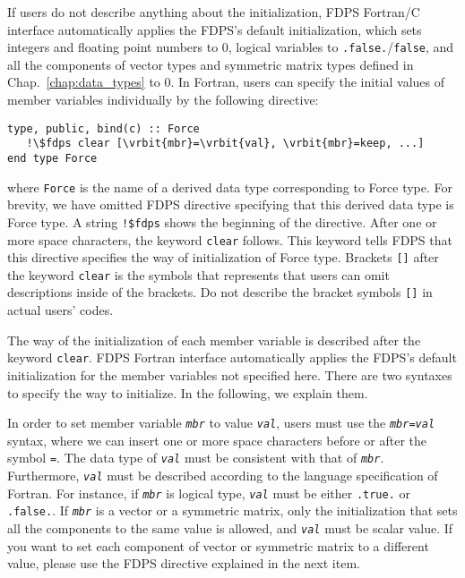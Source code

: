 \begin{enumerate}[leftmargin=*,label=(\arabic*)]
 If users do not describe anything about the initialization, FDPS Fortran/C interface automatically applies the FDPS's default initialization, which sets integers and floating point numbers to 0, logical variables to \texttt{.false.}/\texttt{false}, and all the components of vector types and symmetric matrix types defined in Chap.~\ref{chap:data_types} to 0.
In Fortran, users can specify the initial values of member variables individually by the following directive:
\begin{screen}
\begin{Verbatim}[commandchars=\\\{\}]
type, public, bind(c) :: Force
   !\$fdps clear [\vrbit{mbr}=\vrbit{val}, \vrbit{mbr}=keep, ...] 
end type Force
\end{Verbatim}
\end{screen}
where \texttt{Force} is the name of a derived data type corresponding to Force type. For brevity, we have omitted FDPS directive specifying that this derived data type is Force type. A string \texttt{!\$fdps} shows the beginning of the directive. After one or more space characters, the keyword \texttt{clear} follows. This keyword tells FDPS that this directive specifies the way of initialization of Force type. Brackets \texttt{[]} after the keyword \texttt{clear} is the symbols that represents that users can omit descriptions inside of the brackets. Do not describe the bracket symbols \texttt{[]} in actual users' codes.

The way of the initialization of each member variable is described after the keyword \texttt{clear}. FDPS Fortran interface automatically applies the FDPS's default initialization for the member variables not specified here. There are two syntaxes to specify the way to initialize. In the following, we explain them.

In order to set member variable \textit{\texttt{mbr}} to value \textit{\texttt{val}}, users must use the \texttt{\textit{mbr}=\textit{val}} syntax, where we can insert one or more space characters before or after the symbol \texttt{=}. The data type of \textit{\texttt{val}} must be consistent with that of \textit{\texttt{mbr}}. Furthermore, \textit{\texttt{val}} must be described according to the language specification of Fortran. For instance, if \textit{\texttt{mbr}} is logical type, \textit{\texttt{val}} must be either \texttt{.true.} or \texttt{.false.}. If \textit{\texttt{mbr}} is a vector or a symmetric matrix, only the initialization that sets all the components to the same value is allowed, and \textit{\texttt{val}} must be scalar value. If you want to set each component of vector or symmetric matrix to a different value, please use the FDPS directive explained in the next item.


\end{enumerate}
